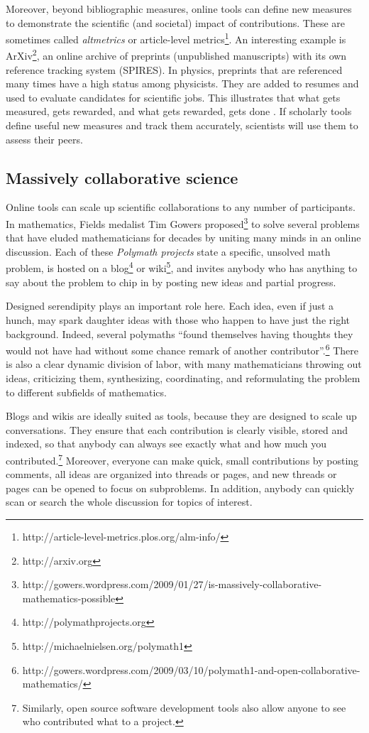 \documentclass{acmproc-sp}
\begin{document}
Moreover, beyond bibliographic measures, online tools can define new measures to demonstrate the scientific (and societal) impact of contributions. These are sometimes called \textit{altmetrics} \cite{altmetrics} or article-level metrics\footnote{http://article-level-metrics.plos.org/alm-info/}. An interesting example is ArXiv\footnote{http://arxiv.org}, an online archive of preprints (unpublished manuscripts) with its own reference tracking system (SPIRES). In physics, preprints that are referenced many times have a high status among physicists. They are added to resumes and used to evaluate candidates for scientific jobs. This illustrates that what gets measured, gets rewarded, and what gets rewarded, gets done \cite{nielsen2012reinventing,ostrom2000collective}. If scholarly tools define useful new measures and track them accurately, scientists will use them to assess their peers.

\subsection{Massively collaborative science}
Online tools can scale up scientific collaborations to any number of participants. In mathematics, Fields medalist Tim Gowers proposed\footnote{http://gowers.wordpress.com/2009/01/27/is-massively-collaborative-mathematics-possible} to solve 
several problems that have eluded mathematicians for decades by uniting many minds in an online discussion. Each of these \textit{Polymath projects} state a specific, unsolved math problem, is hosted on a blog\footnote{http://polymathprojects.org} or wiki\footnote{http://michaelnielsen.org/polymath1}, and invites anybody who has anything to say about the problem to chip in by posting new ideas and partial progress.

Designed serendipity plays an important role here. Each idea, even if just a hunch, may spark daughter ideas with those who happen to have just the right background. Indeed, several polymaths ``found themselves having thoughts they would not have had without some chance remark of another contributor''.\footnote{http://gowers.wordpress.com/2009/03/10/polymath1-and-open-collaborative-mathematics/} There is also a clear dynamic division of labor, with many mathematicians throwing out ideas, criticizing them, synthesizing, coordinating, and reformulating the problem to different subfields of mathematics. 

Blogs and wikis are ideally suited as tools, because they are designed to scale up conversations. They ensure that each contribution is clearly visible, stored and indexed, so that anybody can always see exactly what and how much you contributed.\footnote{Similarly, open source software development tools also allow anyone to see who contributed what to a project.} Moreover, everyone can make quick, small contributions by posting comments, all ideas are organized into threads or pages, and new threads or pages can be opened to focus on subproblems. In addition, anybody can quickly scan or search the whole discussion for topics of interest. %
\end{document}
